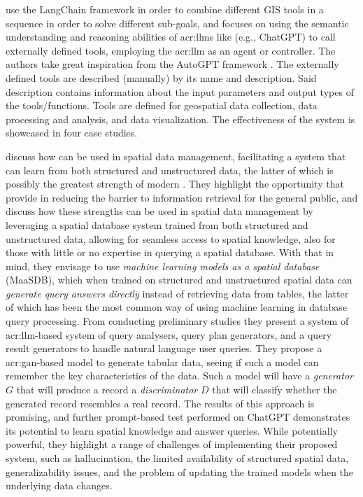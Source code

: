 \cite{zhangGeoGPTUnderstandingProcessing2023} use the LangChain framework \citep{chaseLangChain2022} in order to combine different GIS tools in a sequence in order to solve different sub-goals, and focuses on using the semantic understanding and reasoning abilities of \glspl{acr:llm} like (e.g., ChatGPT) to call externally defined tools, employing the \gls{acr:llm} as an agent or controller. The authors take great inspiration from the AutoGPT framework \citep{richardAutoGPTHeartOpensource2023}. The externally defined tools are described (manually) by its name and description. Said description contains information about the input parameters and output types of the tools/functions. Tools are defined for geospatial data collection, data processing and analysis, and data visualization. The effectiveness of the system is showcased in four case studies.

\cite{qiMaaSDBSpatialDatabases2023} discuss how  can be used in spatial data management, facilitating a system that can learn from both structured and unstructured data, the latter of which is possibly the greatest strength of modern . They highlight the opportunity that  provide in reducing the barrier to information retrieval for the general public, and discuss how these strengths can be used in spatial data management by leveraging a spatial database system trained from both structured and unstructured data, allowing for seamless access to spatial knowledge, also for those with little or no expertise in querying a spatial database. With that in mind, they envisage to use \textit{machine learning models as a spatial database} (MaaSDB), which when trained on structured and unstructured spatial data can \textit{generate query answers directly} instead of retrieving data from tables, the latter of which has been the most common way of using machine learning in database query processing. From conducting preliminary studies they present a system of \acrshort{acr:llm}-based system of query analysers, query plan generators, and a query result generators to handle natural language user queries. They propose a \gls{acr:gan}-based model to generate tabular data, seeing if such a model can remember the key characteristics of the data. Such a model will have a \textit{generator} $G$ that will produce a record a \textit{discriminator} $D$ that will classify whether the generated record resembles a real record. The results of this approach is promising, and further prompt-based test performed on ChatGPT demonstrates its potential to learn spatial knowledge and answer queries. While potentially powerful, they highlight a range of challenges of implementing their proposed system, such as hallucination, the limited availability of structured spatial data, generalizability issues, and the problem of updating the trained models when the underlying data changes.



